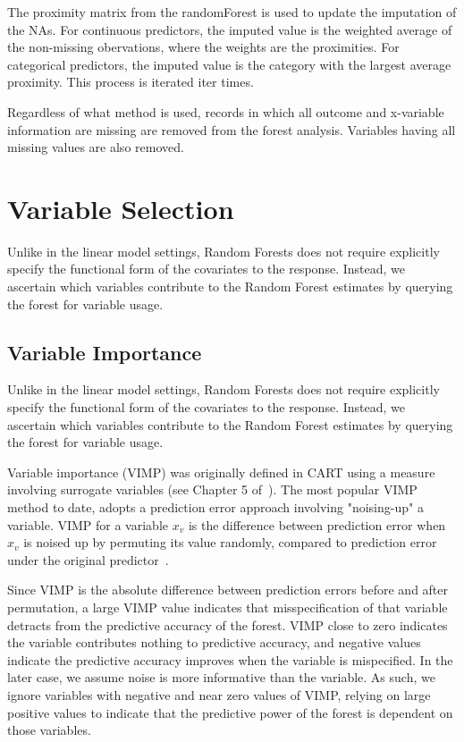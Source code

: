 \documentclass[nojss]{jss}\usepackage[]{graphicx}\usepackage[]{color}
\begin{document}
The proximity matrix from the randomForest is used to update the imputation of the NAs. For continuous predictors, the imputed value is the weighted average of the non-missing obervations, where the weights are the proximities. For categorical predictors, the imputed value is the category with the largest average proximity. This process is iterated iter times.

Regardless of what method is used, records in which all outcome and x-variable information are missing are removed from the forest analysis. Variables having all missing values are also removed.


\section{Variable Selection}
Unlike in the linear model settings, Random Forests does not require explicitly specify the functional form of the covariates to the response. Instead, we ascertain which variables contribute to the Random Forest estimates by querying the forest for variable usage. 

\subsection{Variable Importance}\label{S:vimp}
Unlike in the linear model settings, Random Forests does not require explicitly specify the functional form of the covariates to the response. Instead, we ascertain which variables contribute to the Random Forest estimates by querying the forest for variable usage. 

Variable importance (VIMP) was originally defined in CART using a measure involving surrogate variables (see Chapter 5 of~\cite{cart:1984}). The most popular VIMP method to date, adopts a prediction error approach involving "noising-up" a variable. VIMP for a variable $x_v$ is the difference between prediction error when $x_v$ is noised up by permuting its value randomly, compared to prediction error under the original predictor~\citep{Breiman:2001,liaw:2002,Ishwaran:2007,Ishwaran:2008}.

Since VIMP is the absolute difference between prediction errors before and after permutation, a large VIMP value indicates that misspecification of that variable detracts from the predictive accuracy of the forest. VIMP close to zero indicates the variable contributes nothing to predictive accuracy, and negative values indicate the predictive accuracy improves when the variable is mispecified. In the later case, we assume noise is more informative than the variable. As such, we ignore variables with negative and near zero values of VIMP, relying on large positive values to indicate that the predictive power of the forest is dependent on those variables. 
\end{document}
